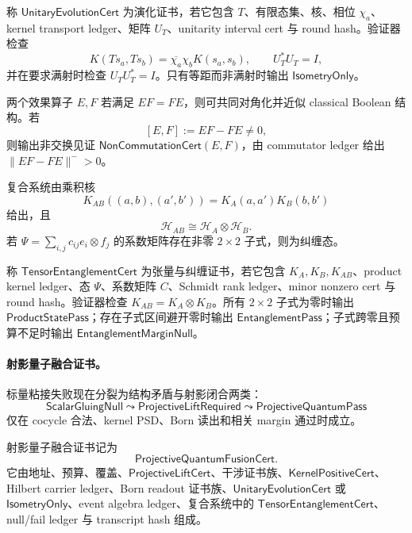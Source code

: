 \begin{definition}[离散幺正演化证书]\label{def:typed-address-biaxial-completion-unitary-evolution-cert}
称 \(\mathsf{UnitaryEvolutionCert}\) 为演化证书，若它包含 \(T\)、有限态集、核、相位 \(\chi_a\)、kernel transport ledger、矩阵 \(U_T\)、unitarity interval cert 与 round hash。验证器检查
\[
K(Ts_a,Ts_b)=\overline{\chi_a}\chi_bK(s_a,s_b),
\qquad
U_T^*U_T=I,
\]
并在要求满射时检查 \(U_TU_T^*=I\)。只有等距而非满射时输出 \(\mathsf{IsometryOnly}\)。
\end{definition}

两个效果算子 \(E,F\) 若满足 \(EF=FE\)，则可共同对角化并近似 classical Boolean 结构。若
\[
[E,F]:=EF-FE\ne0,
\]
则输出非交换见证 \(\mathsf{NonCommutationCert}(E,F)\)，由 commutator ledger 给出 \(\|EF-FE\|^->0\)。

复合系统由乘积核
\[
K_{AB}((a,b),(a',b'))=K_A(a,a')K_B(b,b')
\]
给出，且
\[
\mathcal H_{AB}\cong\mathcal H_A\otimes\mathcal H_B.
\]
若 \(\Psi=\sum_{i,j}c_{ij}e_i\otimes f_j\) 的系数矩阵存在非零 \(2\times2\) 子式，则为纠缠态。

\begin{definition}[张量纠缠证书]\label{def:typed-address-biaxial-completion-tensor-entanglement-cert}
称 \(\mathsf{TensorEntanglementCert}\) 为张量与纠缠证书，若它包含 \(K_A,K_B,K_{AB}\)、product kernel ledger、态 \(\Psi\)、系数矩阵 \(C\)、Schmidt rank ledger、minor nonzero cert 与 round hash。验证器检查 \(K_{AB}=K_A\otimes K_B\)。所有 \(2\times2\) 子式为零时输出 \(\mathsf{ProductStatePass}\)；存在子式区间避开零时输出 \(\mathsf{EntanglementPass}\)；子式跨零且预算不足时输出 \(\mathsf{EntanglementMarginNull}\)。
\end{definition}

\paragraph{射影量子融合证书。}
标量粘接失败现在分裂为结构矛盾与射影闭合两类：
\[
\mathsf{ScalarGluingNull}
\leadsto
\mathsf{ProjectiveLiftRequired}
\leadsto
\mathsf{ProjectiveQuantumPass}
\]
仅在 cocycle 合法、kernel PSD、Born 读出和相关 margin 通过时成立。

\begin{definition}[射影量子融合证书]\label{def:typed-address-biaxial-completion-projective-quantum-fusion-cert}
射影量子融合证书记为
\[
\mathsf{ProjectiveQuantumFusionCert}.
\]
它由地址、预算、覆盖、\(\mathsf{ProjectiveLiftCert}\)、干涉证书族、\(\mathsf{KernelPositiveCert}\)、Hilbert carrier ledger、Born readout 证书族、\(\mathsf{UnitaryEvolutionCert}\) 或 \(\mathsf{IsometryOnly}\)、event algebra ledger、复合系统中的 \(\mathsf{TensorEntanglementCert}\)、null/fail ledger 与 transcript hash 组成。
\end{definition}

